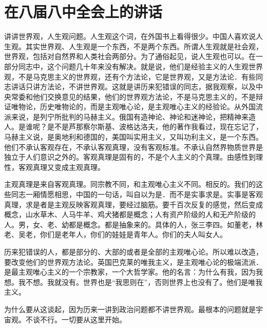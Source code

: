 \section[在八届八中全会上的讲话（一九五九年八月十一日）]{在八届八中全会上的讲话}


讲讲世界观，人生观问题。人生观这个词，在外国书上看得很少。中国人喜欢说人生观。其实世界观、人生观是一个东西，不是两个东西。所谓人生观就是社会观，世界观，包括对自然界和人类社会两部分。为了通俗起见，说人生观也可以。在一部分同志中，这个问题几十年来没有解决。就是说，他们是经验主义的人生观世界观，不是马克思主义的世界观，还有个方法论，它是世界观，又是方法论．有些同志讲话只讲方法论，不讲世界观。这就是讲历来犯错误的同志，据我观察，以及中央常委和他们交换意见的结果，他们的世界观方法论，不是马克思主义的，不是辩证唯物论，历史唯物论的，而是主观唯心论，是主观唯心主义的经验论。从外国流派来说，是列宁所批判的马赫主义。俄国有造神论、神论和迷神论，把精神来造人。是谁呢？是不是芦那察尔斯基、波格达洛夫，他的著作我看过，现在忘记了，马赫主义说，是奥地利和德国的，美国叫实用主义，又叫功利主义，是一个东西。他们不承认客观存在，不承认客观真理，没有客观标准。不承认自然界物质世界是独立于人们意识之外的。客观真理是固有的，不是个人主义的个真理。由感性到理性，客观真理又变成主观真理。

主观真理是来自客观真理。同宗教不同，和主观唯心主义不同。相反的。我们的这些同志一厢情愿相思，中国的一句话，叫自以为是．而不是实事求是。实事是客观真理，求是者是主观反映客观真理，要经过脑筋。要千百次反复的感觉，然后变成概念，山水草木、人马牛羊、鸡犬猪都是概念；人有资产阶级的人和无产阶级的人。男，女、老、幼都是概念。都是抽象来的。具体的人，张三李四。如董老，林老、吴老，你们是老年人，你们的娃娃是青年人。你们的夫人叫女人。

历来犯错误的人，都是部分的、大部的或者是全部的主观唯心论。所以难以改造，要改变他们的世界观方法论。英国巴克莱的唯我主义，是主观唯心论的极端流派．是最主观唯心主义的一个宗教家，一个大哲学家。他的名言：为什么有我，因为我想。我不想。我就没有。世界也是“我思则在”，否则世界上也没有了。他们是唯我主义。

为什么要从这谈起，因为历来一讲到政治问题都不讲世界观。最根本的问题就是宇宙观。不谈不行。一切要从这里开始。


